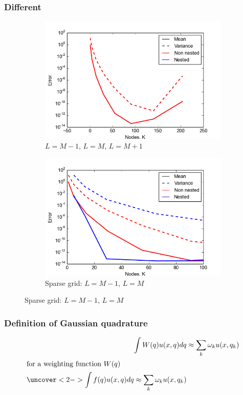 \documentclass{beamer}
\begin{document}
  \begin{frame}
 \frametitle{Different }
 \begin{figure}        
 \begin{subfigure}[b]{0.5\textwidth}
                \includegraphics[width=\textwidth]{convergence_2D_L.png}
                \caption{$L=M-1$, $L=M$, $L=M+1$}
        \end{subfigure}%
 \begin{subfigure}[b]{0.5\textwidth}
                \includegraphics[width=\textwidth]{convergence_2D_L_sparse.png}
                \caption{Sparse grid: $L=M-1$, $L=M$}
        \end{subfigure}
        \end{figure}
\end{frame}
  
  
  
 \begin{frame}
  \frametitle{Definition of Gaussian quadrature}
  \begin{align*}
   \int W(q)u(x,q)dq &\approx \sum_k \omega_k u(x,q_k)\\
   \intertext{for a weighting function $W(q)$}
   \uncover<2-> {\int f(q)u(x,q)dq \approx \sum_k \omega_k u(x,q_k)}
    \end{align*}
   \end{frame}
\end{document}
